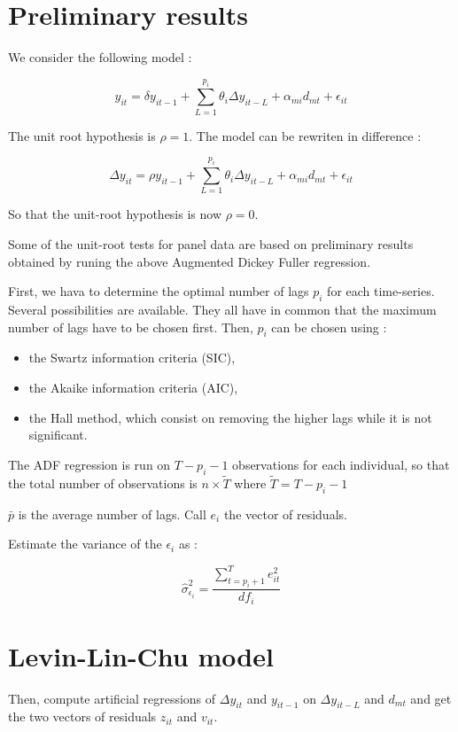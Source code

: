 \documentclass{article}
\begin{document}
\section{Preliminary results}

We consider the following model :

$$
y_{it} = \delta y_{it-1} + \sum_{L=1}^{p_i} \theta_i \Delta
y_{it-L}+\alpha_{mi} d_{mt}+\epsilon_{it}
$$

The unit root hypothesis is $\rho = 1$. The model can be rewriten in
difference :

$$
\Delta y_{it} = \rho y_{it-1} + \sum_{L=1}^{p_i} \theta_i \Delta
y_{it-L}+\alpha_{mi} d_{mt}+\epsilon_{it}
$$

So that the unit-root hypothesis is now $\rho = 0$.

Some of the unit-root tests for panel data are based on preliminary
results obtained by runing the above Augmented Dickey Fuller
regression. 

First, we hava to determine the optimal number of lags $p_i$ for each
time-series. Several possibilities are available. They all have in
common that the maximum number of lags have to be chosen first. Then,
$p_i$ can be chosen using :

\begin{itemize}
\item the Swartz information criteria (SIC),
\item the Akaike information criteria (AIC),
\item the Hall method, which consist on removing the higher lags while
  it is not significant.
\end{itemize}

The ADF regression is run on $T-p_i-1$ observations for
each individual, so that the total number of observations is $n\times
\tilde{T}$ where $\tilde{T}=T-p_i-1$

$\bar{p}$ is the average number of lags. Call $e_{i}$ the
vector of residuals.

Estimate the variance of the $\epsilon_i$ as :

$$
\hat{\sigma}_{\epsilon_i}^2 = \frac{\sum_{t=p_i+1}^{T} e_{it}^2}{df_i}
$$



\section{Levin-Lin-Chu model}

Then, compute artificial regressions of $\Delta y_{it}$ and $y_{it-1}$
on $\Delta y_{it-L}$ and $d_{mt}$ and get the two vectors of residuals
$z_{it}$ and $v_{it}$. 
\end{document}
